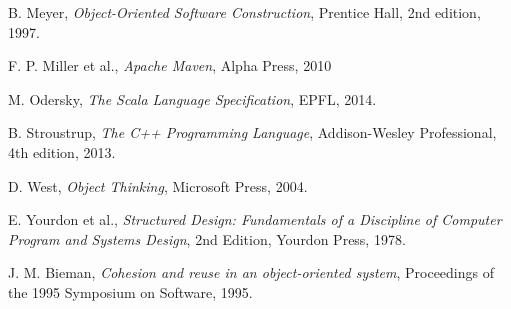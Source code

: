 \documentclass[conference]{IEEEtran}
\begin{document}
\begin{thebibliography}{}
{
B. Meyer,
\emph{Object-Oriented Software Construction},
Prentice Hall, 2nd edition, 1997.

F. P. Miller et al.,
\emph{Apache Maven},
Alpha Press, 2010

M. Odersky,
\emph{The Scala Language Specification},
EPFL, 2014.

B. Stroustrup,
\emph{The C++ Programming Language},
Addison-Wesley Professional, 4th edition, 2013.

D. West,
\emph{Object Thinking},
Microsoft Press, 2004.

E. Yourdon et al.,
\emph{Structured Design: Fundamentals of a Discipline of Computer Program and Systems Design},
2nd Edition, Yourdon Press, 1978.

J. M. Bieman,
\emph{Cohesion and reuse in an object-oriented system},
Proceedings of the 1995 Symposium on Software, 1995.
}

\end{thebibliography}
\end{document}

